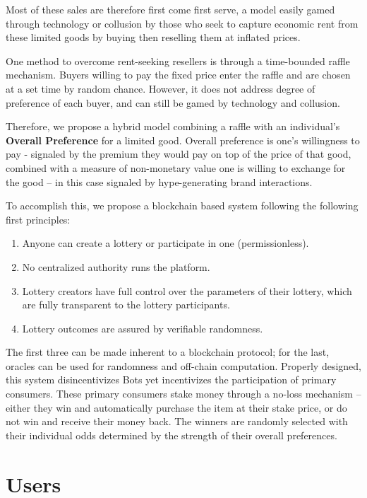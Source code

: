 \documentclass[runningheads]{llncs}
\begin{document}
Most of these sales are therefore first come first serve, a model easily gamed through technology or collusion by those who seek to capture economic rent from these limited goods by buying then reselling them at inflated prices.

One method to overcome rent-seeking resellers is through a time-bounded raffle mechanism.\cite{18}   Buyers willing to pay the fixed price enter the raffle and are chosen at a set time by random chance.  However, it does not address degree of preference of each buyer, and can still be gamed by technology and collusion.

Therefore, we propose a hybrid model combining a raffle with an individual’s \textbf{Overall Preference} for a limited good.  Overall preference is one’s willingness to pay - signaled by the premium they would pay on top of the price of that good, combined with a measure of non-monetary value one is willing to exchange for the good – in this case signaled by hype-generating brand interactions.

To accomplish this, we propose a blockchain based system following the following first principles:
\begin{enumerate}
\item Anyone can create a lottery or participate in one (permissionless).
\item No centralized authority runs the platform.
\item Lottery creators have full control over the parameters of their lottery, which are fully transparent to the lottery participants.
\item Lottery outcomes are assured by verifiable randomness. 
\end{enumerate}

The first three can be made inherent to a blockchain protocol; for the last, oracles can be used for randomness and off-chain computation.  Properly designed, this system disincentivizes Bots yet incentivizes the participation of primary consumers.  These primary consumers stake money through a no-loss mechanism – either they win and automatically purchase the item at their stake price, or do not win and receive their money back.  The winners are randomly selected with their individual odds determined by the strength of their overall preferences.


\section{Users}\label{section-Users}
\end{document}
